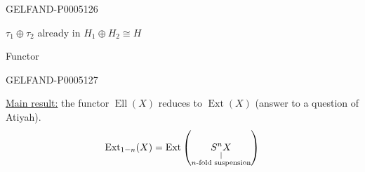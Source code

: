 \begin{GelfandAdjacentEvidence}{GELFAND-P000512}{6}

$\tau_1\oplus\tau_2$ already in $H_1\oplus H_2\cong H$

Functor
\end{GelfandAdjacentEvidence}
\begin{GelfandAdjacentEvidence}{GELFAND-P000512}{7}


\uline{Main result:} the functor $\operatorname{Ell}(X)$ reduces to
$\operatorname{Ext}(X)$ (answer to a question of Atiyah).
\[
\operatorname{Ext}_{1-n}(X)=
\operatorname{Ext}\left(
\underset{\substack{\vert\\\text{\mbox{$n$}-fold suspension}}}{S^nX}
\right)
\]
\end{GelfandAdjacentEvidence}



